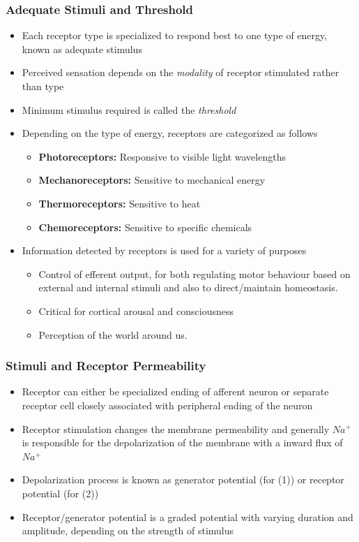 \documentclass[11pt]{article}
\begin{document}
\subsubsection{Adequate Stimuli and Threshold}
\begin{itemize}
\item Each receptor type is specialized to respond best to one type of energy, known as adequate stimulus
\item Perceived sensation depends on the \textit{modality} of receptor stimulated rather than type
\item Minimum stimulus required is called the \textit{threshold}
\item Depending on the type of energy, receptors are categorized as follows
\begin{itemize}
\item \textbf{Photoreceptors: }Responsive to visible light wavelengths
\item \textbf{Mechanoreceptors:} Sensitive to mechanical energy 
\item \textbf{Thermoreceptors: }Sensitive to heat
\item \textbf{Chemoreceptors:} Sensitive to specific chemicals 
\end{itemize}
\item Information detected by receptors is used for a variety of purposes 
\begin{itemize}
\item Control of efferent output, for both regulating motor behaviour based on external and internal stimuli and also to direct/maintain homeostasis. 
\item Critical for cortical arousal and consciousness 
\item Perception of the world around us. 
\end{itemize}
\end{itemize}

\subsubsection{Stimuli and Receptor Permeability}
\begin{itemize}
\item Receptor can either be specialized ending of afferent neuron
or separate receptor cell closely associated with peripheral ending of the neuron
\item Receptor stimulation changes the membrane permeability and generally $Na^+$ is responsible for the depolarization of the membrane with a inward flux of $Na^+$
\item Depolarization process is known as generator potential (for (1)) or receptor potential (for (2))
\item Receptor/generator potential is a graded potential with varying duration and amplitude, depending on the strength of stimulus
\end{itemize}
\end{document}
